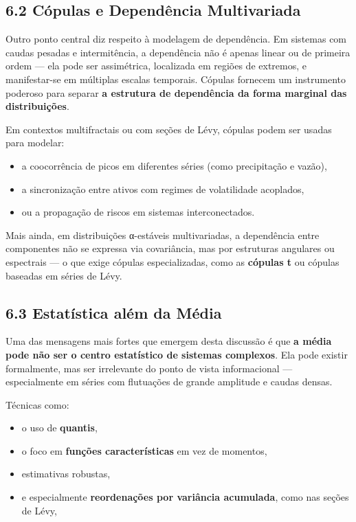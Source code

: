 \documentclass[
  portuguese,
]{agujournal2019}
\providecommand{\tightlist}{%
  \setlength{\itemsep}{0pt}\setlength{\parskip}{0pt}}
\begin{document}
\subsection{6.2 Cópulas e Dependência
Multivariada}\label{cuxf3pulas-e-dependuxeancia-multivariada}

Outro ponto central diz respeito à modelagem de dependência. Em sistemas
com caudas pesadas e intermitência, a dependência não é apenas linear ou
de primeira ordem --- ela pode ser assimétrica, localizada em regiões de
extremos, e manifestar-se em múltiplas escalas temporais. Cópulas
fornecem um instrumento poderoso para separar \textbf{a estrutura de
dependência da forma marginal das distribuições}.

Em contextos multifractais ou com seções de Lévy, cópulas podem ser
usadas para modelar:

\begin{itemize}
\tightlist
\item
  a coocorrência de picos em diferentes séries (como precipitação e
  vazão),
\item
  a sincronização entre ativos com regimes de volatilidade acoplados,
\item
  ou a propagação de riscos em sistemas interconectados.
\end{itemize}

Mais ainda, em distribuições α-estáveis multivariadas, a dependência
entre componentes não se expressa via covariância, mas por estruturas
angulares ou espectrais --- o que exige cópulas especializadas, como as
\textbf{cópulas t} ou cópulas baseadas em séries de Lévy.

\subsection{6.3 Estatística além da
Média}\label{estatuxedstica-aluxe9m-da-muxe9dia}

Uma das mensagens mais fortes que emergem desta discussão é que
\textbf{a média pode não ser o centro estatístico de sistemas
complexos}. Ela pode existir formalmente, mas ser irrelevante do ponto
de vista informacional --- especialmente em séries com flutuações de
grande amplitude e caudas densas.

Técnicas como:

\begin{itemize}
\tightlist
\item
  o uso de \textbf{quantis},
\item
  o foco em \textbf{funções características} em vez de momentos,
\item
  estimativas robustas,
\item
  e especialmente \textbf{reordenações por variância acumulada}, como
  nas seções de Lévy,
\end{itemize}
\end{document}
